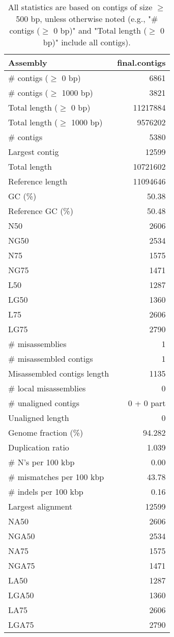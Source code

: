 \documentclass[12pt,a4paper]{article}
\begin{document}
\begin{table}[ht]
\begin{center}
\caption{All statistics are based on contigs of size $\geq$ 500 bp, unless otherwise noted (e.g., "\# contigs ($\geq$ 0 bp)" and "Total length ($\geq$ 0 bp)" include all contigs).}
\begin{tabular}{|l*{1}{|r}|}
\hline
Assembly & final.contigs \\ \hline
\# contigs ($\geq$ 0 bp) & 6861 \\ \hline
\# contigs ($\geq$ 1000 bp) & 3821 \\ \hline
Total length ($\geq$ 0 bp) & 11217884 \\ \hline
Total length ($\geq$ 1000 bp) & 9576202 \\ \hline
\# contigs & 5380 \\ \hline
Largest contig & 12599 \\ \hline
Total length & 10721602 \\ \hline
Reference length & 11094646 \\ \hline
GC (\%) & 50.38 \\ \hline
Reference GC (\%) & 50.48 \\ \hline
N50 & 2606 \\ \hline
NG50 & 2534 \\ \hline
N75 & 1575 \\ \hline
NG75 & 1471 \\ \hline
L50 & 1287 \\ \hline
LG50 & 1360 \\ \hline
L75 & 2606 \\ \hline
LG75 & 2790 \\ \hline
\# misassemblies & 1 \\ \hline
\# misassembled contigs & 1 \\ \hline
Misassembled contigs length & 1135 \\ \hline
\# local misassemblies & 0 \\ \hline
\# unaligned contigs & 0 + 0 part \\ \hline
Unaligned length & 0 \\ \hline
Genome fraction (\%) & 94.282 \\ \hline
Duplication ratio & 1.039 \\ \hline
\# N's per 100 kbp & 0.00 \\ \hline
\# mismatches per 100 kbp & 43.78 \\ \hline
\# indels per 100 kbp & 0.16 \\ \hline
Largest alignment & 12599 \\ \hline
NA50 & 2606 \\ \hline
NGA50 & 2534 \\ \hline
NA75 & 1575 \\ \hline
NGA75 & 1471 \\ \hline
LA50 & 1287 \\ \hline
LGA50 & 1360 \\ \hline
LA75 & 2606 \\ \hline
LGA75 & 2790 \\ \hline
\end{tabular}
\end{center}
\end{table}
\end{document}
